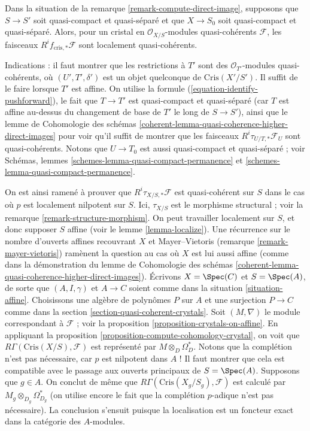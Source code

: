 \begin{remark}
\label{remark-quasi-coherent}
Dans la situation de la remarque \ref{remark-compute-direct-image},
supposons que $S \to S'$ soit quasi-compact et quasi-séparé et
que $X \to S_0$ soit quasi-compact et quasi-séparé. Alors, pour un cristal
en $\mathcal{O}_{X/S}$-modules quasi-cohérents $\mathcal{F}$,
les faisceaux $R^if_{\text{cris}, *}\mathcal{F}$ sont localement quasi-cohérents.

\medskip\noindent
Indications : il faut montrer que les restrictions à $T'$ sont des
$\mathcal{O}_{T'}$-modules quasi-cohérents, où $(U', T', \delta')$ est un objet quelconque de
$\text{Cris}(X'/S')$. Il suffit de le faire lorsque $T'$ est affine.
On utilise la formule (\ref{equation-identify-pushforward}),
le fait que $T \to T'$ est quasi-compact et quasi-séparé (car $T$
est affine au-dessus du changement de base de $T'$ le long de $S \to S'$), ainsi que le
lemme de Cohomologie des schémas
\ref{coherent-lemma-quasi-coherence-higher-direct-images}
pour voir qu'il suffit de montrer que les faisceaux
$R^i\tau_{U/T, *}\mathcal{F}_U$ sont quasi-cohérents.
Notons que $U \to T_0$ est aussi quasi-compact et quasi-séparé ; voir
Schémas, lemmes \ref{schemes-lemma-quasi-compact-permanence} et
\ref{schemes-lemma-quasi-compact-permanence}.

\medskip\noindent
On est ainsi ramené à prouver que $R^i\tau_{X/S, *}\mathcal{F}$
est quasi-cohérent sur $S$ dans le cas où $p$ est localement nilpotent sur $S$. Ici,
$\tau_{X/S}$ est le morphisme structural ; voir la
remarque \ref{remark-structure-morphism}.
On peut travailler localement sur $S$, et donc supposer $S$ affine
(voir le lemme \ref{lemma-localize}). Une récurrence sur le nombre
d'ouverts affines recouvrant $X$ et Mayer--Vietoris
(remarque \ref{remark-mayer-vietoris}) ramènent la question
au cas où $X$ est lui aussi affine (comme dans la démonstration du
lemme de Cohomologie des schémas
\ref{coherent-lemma-quasi-coherence-higher-direct-images}).
Écrivons $X = \Spec(C)$ et $S = \Spec(A)$, de sorte que $(A, I, \gamma)$ et
$A \to C$ soient comme
dans la situation \ref{situation-affine}. Choisissons une algèbre de polynômes
$P$ sur $A$ et une surjection $P \to C$ comme dans la
section \ref{section-quasi-coherent-crystals}.
Soit $(M, \nabla)$ le module correspondant à $\mathcal{F}$ ; voir la
proposition \ref{proposition-crystals-on-affine}.
En appliquant la 
proposition \ref{proposition-compute-cohomology-crystal},
on voit que $R\Gamma(\text{Cris}(X/S), \mathcal{F})$ est représenté par
$M \otimes_D \Omega_D^*$. Notons que la complétion n'est pas nécessaire,
car $p$ est nilpotent dans $A$ ! Il faut montrer que cela est compatible
avec le passage aux ouverts principaux de $S = \Spec(A)$. Supposons que $g \in A$.
On conclut de même que $R\Gamma(\text{Cris}(X_g/S_g), \mathcal{F})$
est calculé par $M_g \otimes_{D_g} \Omega_{D_g}^*$ (on utilise encore le fait que
la complétion $p$-adique n'est pas nécessaire). La conclusion s'ensuit puisque la localisation
est un foncteur exact dans la catégorie des $A$-modules.
\end{remark}

